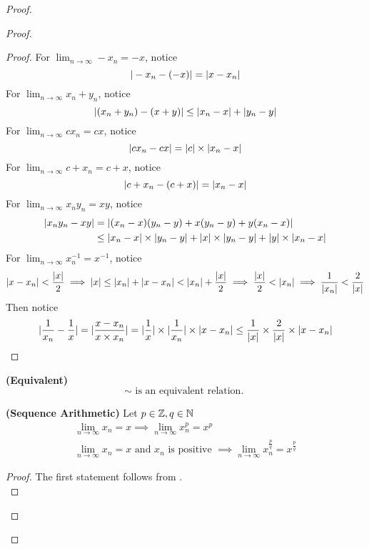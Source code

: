 \documentclass{report}
\begin{document}
\begin{proof}
\begin{proof}
\begin{proof}
For $\lim_{n\to\infty}-x_n=-x$, notice
\begin{equation}
  |-x_n-(-x)|=|x-x_n|
\end{equation}
For $\lim_{n\to\infty}x_n+y_n$, notice
\begin{equation}
|(x_n+y_n)-(x+y)|\leq |x_n-x|+|y_n-y|
\end{equation}
For $\lim_{n\to\infty} cx_n=cx$, notice
\begin{equation}
|cx_n-cx|=|c|\times|x_n-x|
\end{equation}
For $\lim_{n\to\infty} c+x_n=c+x$, notice
\begin{equation}
|c+x_n-(c+x)|=|x_n-x|
\end{equation}
For $\lim_{n\to\infty} x_ny_n=xy$, notice
\begin{align}
  |x_ny_n-xy|&=|(x_n-x)(y_n-y)+x(y_n-y)+y(x_n-x)|\\
  &\leq |x_n-x|\times|y_n-y|+|x|\times|y_n-y|+|y|\times|x_n-x|
\end{align}
For $\lim_{n\to\infty}x_n^{-1}=x^{-1}$, notice 
\begin{equation}
\abso{x-x_n}<\frac{\abso{x}}{2}\implies \abso{x}\leq \abso{x_n}+\abso{x-x_n}<\abso{x_n}+\frac{\abso{x}}{2}\implies \frac{\abso{x}}{2}<\abso{x_n}\implies \frac{1}{\abso{x_n}}<\frac{2}{\abso{x}}
\end{equation}
Then notice
\begin{equation}
|\frac{1}{x_n}-\frac{1}{x}|=|\frac{x-x_n}{x\times x_n}|=|\frac{1}{x}|\times |\frac{1}{x_n}|\times |x-x_n|\leq \frac{1}{|x|}\times \frac{2}{|x|}\times |x-x_n|
\end{equation}
\end{proof}
\begin{corollary}
\label{4.1.7}
\textbf{(Equivalent)} 
\begin{equation}
\sim\text{ is an equivalent relation. }
\end{equation}
\end{corollary}
\begin{corollary}
\label{4.1.8}
\textbf{(Sequence Arithmetic)} Let $p\in\mathbb{Z},q\in\mathbb{N}$
\begin{gather}
\lim_{n\to\infty} x_n=x\implies \lim_{n\to\infty} x_n^p=x^p\\
\lim_{n\to\infty} x_n=x\text{ and }x_n\text{ is positive }\implies \lim_{n\to\infty} x_n^{\frac{p}{q}}=x^{\frac{p}{q}}
\end{gather}
\end{corollary}
\begin{proof}
The first statement follows from .\\


\end{proof}
\end{proof}
\end{proof}
\end{document}
